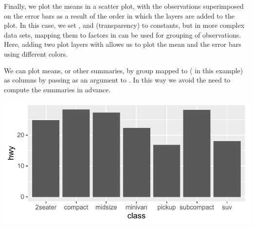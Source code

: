 \documentclass[krantz2]{krantz}\usepackage{knitr}
\begin{document}
Finally, we plot the means in a scatter plot, with the observations superimposed on the error bars as a result of the order in which the layers are added to the plot. In this case, we set ,  and  (transparency) to constants, but in more complex data sets, mapping them to factors in  can be used for grouping of observations. Here, adding two plot layers with  allows us to plot the mean and the error bars using different colors.

\begin{knitrout}\footnotesize
{}\color{fgcolor}\begin{kframe}
\begin{alltt}
\hlstd{(}  \hlstd{(}    \hlopt{+}
  \hlstd{(} \hlstd{=} \hlstd{,}  \hlstd{=} \hlstd{,}
                \hlstd{=} \hlstd{,}  \hlstd{=} \hlstd{)} \hlopt{+}
  \hlstd{(} \hlstd{=} \hlstd{,}
                \hlstd{=} \hlstd{,}
                \hlstd{=} \hlstd{,}  \hlstd{=} \hlstd{,}  \hlstd{=} \hlstd{)} \hlopt{+}
  \hlstd{(} \hlstd{=} \hlstd{,}  \hlstd{=} \hlstd{)}
\end{alltt}
\end{kframe}
\end{knitrout}

We can plot means, or other summaries, by group mapped to  ( in this example) as columns by passing  as an argument to  . In this way we avoid the need to compute the summaries in advance.

\begin{knitrout}\footnotesize
{}\color{fgcolor}\begin{kframe}
\begin{alltt}
  \hlopt{+}
  \hlstd{(} \hlstd{=} \hlstd{,}  
\end{alltt}
\end{kframe}

{\centering \includegraphics[width=.7\textwidth]{figure/pos-summary-plot-09a-1} 

}


\end{knitrout}
\end{document}
